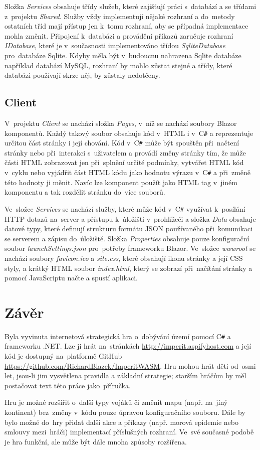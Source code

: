 \documentclass[a4paper,12pt]{article}
\def\CS{C\texttt{\#}}
\begin{document}
Složka \textit{Services} obsahuje třídy služeb, které zajišťují práci s~databází a se třídami z~projektu \textit{Shared}. Služby vždy implementují nějaké rozhraní a do~metody ostatních tříd mají přístup jen k~tomu rozhraní, aby se případná implementace mohla změnit. Připojení k~databázi a provádění příkazů zaručuje rozhraní \textit{IDatabase}, které je v~současnosti implementováno třídou \textit{SqliteDatabase} pro~databáze Sqlite. Kdyby měla být v~budoucnu nahrazena Sqlite databáze například databází MySQL, rozhraní by mohlo zůstat stejné a třídy, které databázi používají skrze něj, by zůstaly nedotčeny.

\subsection{Client}
V~projektu \textit{Client} se nachází složka \textit{Pages}, v~níž se nachází soubory Blazor komponentů. Každý takový soubor obsahuje kód v~HTML i v~\CS{} a reprezentuje určitou část stránky i její chování. Kód v~\CS{} může být spouštěn při~načtení stránky nebo při~interakci s~uživatelem a provádí změny stránky tím, že může části HTML zobrazovat jen při~splnění určité podmínky, vytvářet HTML kód v~cyklu nebo vyjádřit část HTML kódu jako hodnotu výrazu v~\CS{} a při~změně této hodnoty ji měnit. Navíc lze komponent použít jako HTML tag v~jiném komponentu a tak rozdělit stránku do~více souborů.

Ve~složce \textit{Services} se nachází služby, které může kód v~\CS{} využívat k~posílání HTTP dotazů na~server a přístupu k~úložišti v~prohlížeči a složka \textit{Data} obsahuje datové typy, které definují strukturu formátu JSON používaného při~komunikaci se serverem a zápisu do~úložiště. Složka \textit{Properties} obsahuje pouze konfigurační soubor \textit{launchSettings.json} pro~potřeby frameworku Blazor. Ve~složce \textit{wwwroot} se nachází soubory \textit{favicon.ico} a \textit{site.css}, které obsahují ikonu stránky a její CSS styly, a krátký HTML soubor \textit{index.html}, který se zobrazí při~načítání stránky a pomocí JavaScriptu načte a spustí aplikaci.

\section{Závěr}
Byla vyvinuta internetová strategická hra o~dobývání území pomocí \CS{} a frameworku .NET. Lze ji hrát na~stránkách \href{http://imperit.aspifyhost.com}{http://imperit.aspifyhost.com} a její kód je dostupný na~platformě GitHub \href{https://github.com/RichardBlazek/ImperitWASM}{https://github.com/RichardBlazek/ImperitWASM}. Hru mohou hrát děti od~osmi let, jsou-li jim vysvětlena pravidla a základní strategie; starším hráčům by měl postačovat text této práce jako~příručka.

Hru je možné rozšířit o~další typy vojáků či změnit mapu (např. na~jíný kontinent) bez~změny v~kódu pouze úpravou konfiguračního souboru. Dále by bylo možné do~hry přidat další akce a příkazy (např. morová epidemie nebo smlouvy mezi~hráči) implementací příslušných rozhraní. Ve~své současné podobě je hra funkční, ale může být dále mnoha způsoby rozšířena.

\newpage
\printbibliography[heading=bibintoc, title={Použitá literatura}]
\newpage
\listoffigures
\end{document}
